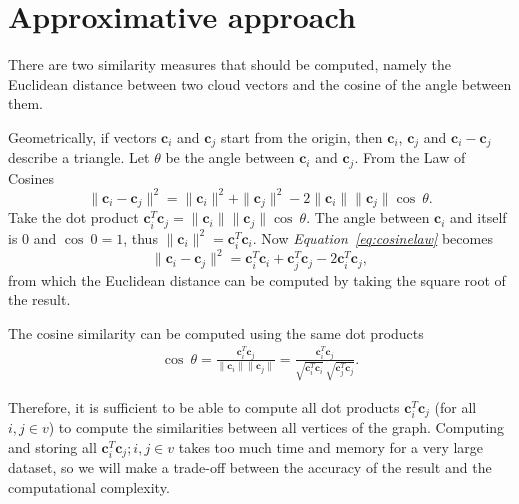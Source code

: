 \documentclass[12pt]{report}
\begin{document}
%
%
\section{Approximative approach}

%
%

There are two similarity measures that should be computed, namely the Euclidean
distance between two cloud vectors and the cosine of the angle between them.

Geometrically, if vectors $\bm{c}_i$ and $\bm{c}_j$ start from the origin, then
$\bm{c}_i$, $\bm{c}_j$ and $\bm{c}_i-\bm{c}_j$ describe a triangle. Let $\theta$
be the angle between $\bm{c}_i$ and $\bm{c}_j$. From the Law of Cosines
%
\begin{equation}
  \label{eq:cosinelaw}
  \|\bm{c}_i-\bm{c}_j\|^2 = \|\bm{c}_i\|^2 + \|\bm{c}_j\|^2 - 2 \|\bm{c}_i\|
  \|\bm{c}_j\| \cos \ \theta.
\end{equation}
%
Take the dot product $\bm{c}^T_i\bm{c}_j = \| \bm{c}_i \| \| \bm{c}_j \| \cos \ \theta$.
The angle between $\bm{c}_i$ and itself is $0$ and $\cos \ 0=1$, thus
$\|\bm{c}_i\|^2 = \bm{c}^T_i\bm{c}_i$. Now \emph{Equation~\ref{eq:cosinelaw}} becomes
%
\begin{equation}
  \label{eq:norm-equation}
  \|\bm{c}_i-\bm{c}_j\|^2 = \bm{c}^T_i\bm{c}_i + \bm{c}^T_j\bm{c}_j - 2 \bm{c}^T_i\bm{c}_j,
\end{equation}
%
from which the Euclidean distance can be computed by taking the square root of the
result.

The cosine similarity can be computed using the same dot products
\begin{align}
  \cos \ \theta = \frac{\bm{c}^T_i\bm{c}_j}{\|\bm{c}_i\|\|\bm{c}_j\|} =
  \frac{\bm{c}^T_i\bm{c}_j}{\sqrt{\bm{c}^T_i\bm{c}_i} \ \sqrt{\bm{c}^T_j\bm{c}_j}}.
\end{align}

Therefore, it is sufficient to be able to compute all dot products $\bm{c}^T_i\bm{c}_j$
(for all $i, j \in v$) to compute the similarities between all vertices of the
graph. Computing and storing all $\bm{c}^T_i\bm{c}_j; i,j \in v$ takes too much
time and memory for a very large dataset, so we will make a trade-off between the
accuracy of the result and the computational complexity.
\end{document}
